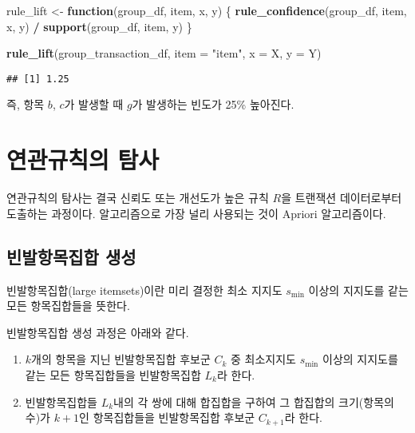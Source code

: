 \documentclass[]{book}
\newenvironment{Shaded}{\begin{snugshade}}{\end{snugshade}}
\newcommand{\ControlFlowTok}[1]{\textcolor[rgb]{0.13,0.29,0.53}{\textbf{#1}}}
\newcommand{\DataTypeTok}[1]{\textcolor[rgb]{0.13,0.29,0.53}{#1}}
\newcommand{\KeywordTok}[1]{\textcolor[rgb]{0.13,0.29,0.53}{\textbf{#1}}}
\newcommand{\NormalTok}[1]{#1}
\newcommand{\OperatorTok}[1]{\textcolor[rgb]{0.81,0.36,0.00}{\textbf{#1}}}
\newcommand{\StringTok}[1]{\textcolor[rgb]{0.31,0.60,0.02}{#1}}
\providecommand{\tightlist}{%
  \setlength{\itemsep}{0pt}\setlength{\parskip}{0pt}}
\begin{document}
\begin{Shaded}
\begin{Highlighting}[]
\NormalTok{rule_lift <-}\StringTok{ }\ControlFlowTok{function}\NormalTok{(group_df, item, x, y) \{}
  \KeywordTok{rule_confidence}\NormalTok{(group_df, item, x, y) }\OperatorTok{/}\StringTok{ }\KeywordTok{support}\NormalTok{(group_df, item, y)}
\NormalTok{\}}
\end{Highlighting}
\end{Shaded}

\begin{Shaded}
\begin{Highlighting}[]
\KeywordTok{rule_lift}\NormalTok{(group_transaction_df, }\DataTypeTok{item =} \StringTok{"item"}\NormalTok{, }\DataTypeTok{x =}\NormalTok{ X, }\DataTypeTok{y =}\NormalTok{ Y)}
\end{Highlighting}
\end{Shaded}

\begin{verbatim}
## [1] 1.25
\end{verbatim}

즉, 항목 \(b\), \(c\)가 발생할 때 \(g\)가 발생하는 빈도가 25\% 높아진다.

\hypertarget{association-rule-exploration}{%
\section{연관규칙의 탐사}\label{association-rule-exploration}}

연관규칙의 탐사는 결국 신뢰도 또는 개선도가 높은 규칙 \(R\)을 트랜잭션 데이터로부터 도출하는 과정이다. 알고리즘으로 가장 널리 사용되는 것이 Apriori 알고리즘\citep{agrawal1994fast}이다.

\hypertarget{apriori-large-itemsets}{%
\subsection{빈발항목집합 생성}\label{apriori-large-itemsets}}

빈발항목집합(large itemsets)이란 미리 결정한 최소 지지도 \(s_{\text{min}}\) 이상의 지지도를 같는 모든 항목집합들을 뜻한다.

빈발항목집합 생성 과정은 아래와 같다.

\begin{enumerate}
\def\labelenumi{\arabic{enumi}.}
\tightlist
\item
  \(k\)개의 항목을 지닌 빈발항목집합 후보군 \(C_{k}\) 중 최소지지도 \(s_{\text{min}}\) 이상의 지지도를 같는 모든 항목집합들을 빈발항목집합 \(L_{k}\)라 한다.
\item
  빈발항목집합들 \(L_{k}\)내의 각 쌍에 대해 합집합을 구하여 그 합집합의 크기(항목의 수)가 \(k + 1\)인 항목집합들을 빈발항목집합 후보군 \(C_{k + 1}\)라 한다.
\end{enumerate}
\end{document}
